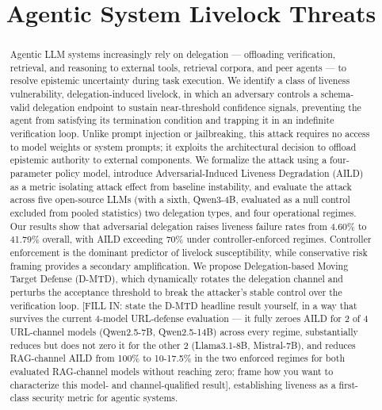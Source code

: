 \documentclass[conference]{IEEEtran}
\begin{document}
\title{Agentic System Livelock Threats}

\author{
}

\maketitle

\begin{abstract}
Agentic LLM systems increasingly rely on delegation — offloading verification, retrieval, and reasoning to external tools, retrieval corpora, and peer agents — to resolve epistemic uncertainty during task execution. We identify a class of liveness vulnerability, delegation-induced livelock, in which an adversary controls a schema-valid delegation endpoint to sustain near-threshold confidence signals, preventing the agent from satisfying its termination condition and trapping it in an indefinite verification loop. Unlike prompt injection or jailbreaking, this attack requires no access to model weights or system prompts; it exploits the architectural decision to offload epistemic authority to external components. We formalize the attack using a four-parameter policy model, introduce Adversarial-Induced Liveness Degradation (AILD) as a metric isolating attack effect from baseline instability, and evaluate the attack across five open-source LLMs (with a sixth, Qwen3-4B, evaluated as a null control excluded from pooled statistics) two delegation types, and four operational regimes. Our results show that adversarial delegation raises liveness failure rates from 4.60\% to 41.79\% overall, with AILD exceeding 70\% under controller-enforced regimes. Controller enforcement is the dominant predictor of livelock susceptibility, while conservative risk framing provides a secondary amplification. We propose Delegation-based Moving Target Defense (D-MTD), which dynamically rotates the delegation channel and perturbs the acceptance threshold to break the attacker's stable control over the verification loop. [FILL IN: state the D-MTD headline result yourself, in a way that survives the current 4-model URL-defense evaluation — it fully zeroes AILD for 2 of 4 URL-channel models (Qwen2.5-7B, Qwen2.5-14B) across every regime, substantially reduces but does not zero it for the other 2 (Llama3.1-8B, Mistral-7B), and reduces RAG-channel AILD from 100\% to 10-17.5\% in the two enforced regimes for both evaluated RAG-channel models without reaching zero; frame how you want to characterize this model- and channel-qualified result], establishing liveness as a first-class security metric for agentic systems.
\end{abstract}
\end{document}
